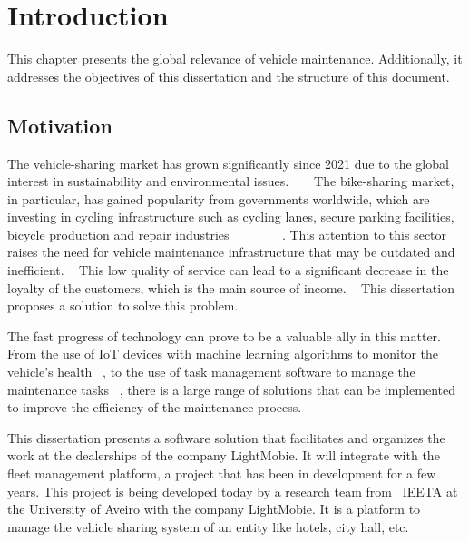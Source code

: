 \chapter{Introduction}%
\label{chapter:introduction}

\begin{introduction}
This chapter presents the global relevance of vehicle maintenance. Additionally, it addresses the objectives of this dissertation and the structure of this document.
\end{introduction} 


\section{Motivation}

The vehicle-sharing market has grown significantly since 2021 due to the global interest in sustainability and environmental issues. ~\cite{cohesionOpenData} ~\cite{bike_data_businessresearch}
The bike-sharing market, in particular, has gained popularity from governments worldwide, which are investing in cycling infrastructure such as cycling lanes, secure parking facilities, bicycle production and repair industries ~\cite{Clercq2023} ~\cite{Cerro2024} ~\cite{European_declararion_on_cycling} ~\cite{bike_data_businessresearch} ~\cite{cohesionOpenData}.
This attention to this sector raises the need for vehicle maintenance infrastructure that may be outdated and inefficient. ~\cite{MAS_MOTORS}
This low quality of service can lead to a significant decrease in the loyalty of the customers, which is the main source of income. ~\cite{Setting_the_after_sale_process}
This dissertation proposes a solution to solve this problem.

The fast progress of technology can prove to be a valuable ally in this matter. 
From the use of IoT devices with machine learning algorithms to monitor the vehicle's health ~\cite{Vasavi2021}, 
to the use of task management software to manage the maintenance tasks ~\cite{MAS_MOTORS}, 
there is a large range of solutions that can be implemented to improve the efficiency of the maintenance process.

This dissertation presents a software solution that facilitates and organizes the work at the dealerships of the company LightMobie. 
It will integrate with the fleet management platform, a project that has been in development for a few years. 
This project is being developed today by a research team from  \ac{IEETA} at the University of Aveiro with the company LightMobie.
It is a platform to manage the vehicle sharing system of an entity like hotels, city hall, etc.  

